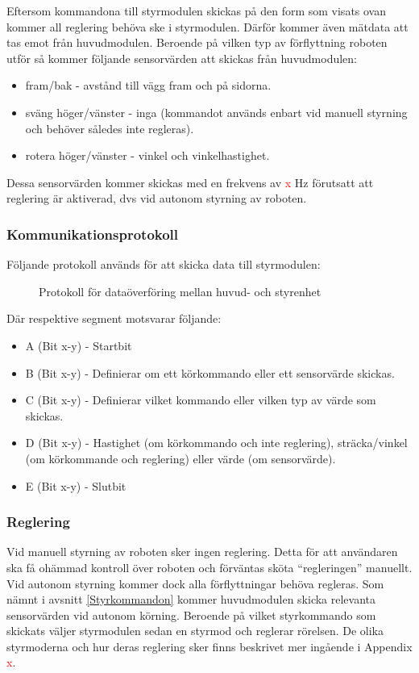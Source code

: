 \documentclass[11pt]{article}
\begin{document}
\begin{flushleft}
Eftersom kommandona till styrmodulen skickas på den form som visats ovan kommer all reglering behöva ske i styrmodulen. Därför kommer även mätdata att tas emot från huvudmodulen. Beroende på vilken typ av förflyttning roboten utför så kommer följande sensorvärden att skickas från huvudmodulen:
\begin{itemize}
	\item fram/bak - avstånd till vägg fram och på sidorna.
	\item sväng höger/vänster - inga (kommandot används enbart vid manuell styrning och behöver således inte regleras).
	\item rotera höger/vänster - vinkel och vinkelhastighet.
\end{itemize}
Dessa sensorvärden kommer skickas med en frekvens av \textcolor{red}{x} Hz förutsatt att reglering är aktiverad, dvs vid autonom styrning av roboten.

\subsubsection{Kommunikationsprotokoll}
Följande protokoll används för att skicka data till styrmodulen:
\begin{figure}[htbp]
\centering
\noindent\resizebox{.8\linewidth}{!}{
	}
	\caption{Protokoll för dataöverföring mellan huvud- och styrenhet\label{styrdata}}	
\end{figure}

Där respektive segment motsvarar följande: 
\begin{itemize}
	\item A (Bit x-y) - Startbit
	\item B (Bit x-y) - Definierar om ett körkommando eller ett sensorvärde skickas.
	\item C (Bit x-y) - Definierar vilket kommando eller vilken typ av värde som skickas.
	\item D (Bit x-y) - Hastighet (om körkommando och inte reglering), sträcka/vinkel (om körkommande och reglering) eller värde (om sensorvärde).
	\item E (Bit x-y) - Slutbit
\end{itemize}

\subsubsection{Reglering}
Vid manuell styrning av roboten sker ingen reglering. Detta för att användaren ska få ohämmad kontroll över roboten och förväntas sköta ``regleringen'' manuellt. Vid autonom styrning kommer dock alla förflyttningar behöva regleras. Som nämnt i avsnitt \ref{Styrkommandon} kommer huvudmodulen skicka relevanta sensorvärden vid autonom körning. Beroende på vilket styrkommando som skickats väljer styrmodulen sedan en styrmod och reglerar rörelsen. De olika styrmoderna och hur deras reglering sker finns beskrivet mer ingående i Appendix \textcolor{red}{x}.


\end{flushleft}
\end{document}
